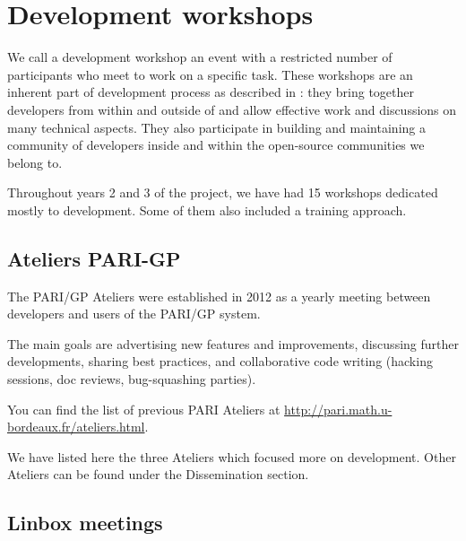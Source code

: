 \documentclass{deliverablereport}
\author{Viviane Pons et al.}
\begin{document}
\maketitle
\githubissuedescription
\newpage
\tableofcontents


\section{Development workshops}

We call a development workshop an event with a restricted number of participants
who meet to work on a specific task. These workshops are an inherent part
of \ODK development process as described in :
 they bring together
developers from within and outside of \ODK and allow effective work
and discussions on many technical aspects. They also participate in building
and maintaining a community of developers inside \ODK and within the
open-source communities we belong to.

Throughout years 2 and 3 of the project, we have had 15 workshops dedicated mostly
to development. Some of them also included a training approach. 

\subsection{Ateliers PARI-GP}

The PARI/GP Ateliers were established in 2012 as a yearly meeting
between developers and users of the PARI/GP system.

The main goals are advertising new features and improvements,
discussing further developments, sharing best practices, and collaborative
code writing (hacking sessions, doc reviews, bug-squashing parties).

You can find the list of previous PARI Ateliers at
\url{http://pari.math.u-bordeaux.fr/ateliers.html}.

We have listed here the three Ateliers which focused more on development. 
Other Ateliers can be found under the Dissemination section.







\subsection{Linbox meetings}
\end{document}
